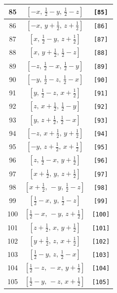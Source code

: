 \documentclass[fleqn,8pt]{jsarticle}
\begin{document}
\begin{longtable}{ccc}
85 & $\left[ - x,\, \frac{1}{2} - y,\, \frac{1}{2} - z \right]$ & {\tt [85]} \\ \hline
86 & $\left[ - x,\, y + \frac{1}{2},\, z + \frac{1}{2} \right]$ & {\tt [86]} \\ \hline
87 & $\left[ x,\, \frac{1}{2} - y,\, z + \frac{1}{2} \right]$ & {\tt [87]} \\ \hline
88 & $\left[ x,\, y + \frac{1}{2},\, \frac{1}{2} - z \right]$ & {\tt [88]} \\ \hline
89 & $\left[ - z,\, \frac{1}{2} - x,\, \frac{1}{2} - y \right]$ & {\tt [89]} \\ \hline
90 & $\left[ - y,\, \frac{1}{2} - z,\, \frac{1}{2} - x \right]$ & {\tt [90]} \\ \hline
91 & $\left[ y,\, \frac{1}{2} - z,\, x + \frac{1}{2} \right]$ & {\tt [91]} \\ \hline
92 & $\left[ z,\, x + \frac{1}{2},\, \frac{1}{2} - y \right]$ & {\tt [92]} \\ \hline
93 & $\left[ y,\, z + \frac{1}{2},\, \frac{1}{2} - x \right]$ & {\tt [93]} \\ \hline
94 & $\left[ - z,\, x + \frac{1}{2},\, y + \frac{1}{2} \right]$ & {\tt [94]} \\ \hline
95 & $\left[ - y,\, z + \frac{1}{2},\, x + \frac{1}{2} \right]$ & {\tt [95]} \\ \hline
96 & $\left[ z,\, \frac{1}{2} - x,\, y + \frac{1}{2} \right]$ & {\tt [96]} \\ \hline
97 & $\left[ x + \frac{1}{2},\, y,\, z + \frac{1}{2} \right]$ & {\tt [97]} \\ \hline
98 & $\left[ x + \frac{1}{2},\, - y,\, \frac{1}{2} - z \right]$ & {\tt [98]} \\ \hline
99 & $\left[ \frac{1}{2} - x,\, y,\, \frac{1}{2} - z \right]$ & {\tt [99]} \\ \hline
100 & $\left[ \frac{1}{2} - x,\, - y,\, z + \frac{1}{2} \right]$ & {\tt [100]} \\ \hline
101 & $\left[ z + \frac{1}{2},\, x,\, y + \frac{1}{2} \right]$ & {\tt [101]} \\ \hline
102 & $\left[ y + \frac{1}{2},\, z,\, x + \frac{1}{2} \right]$ & {\tt [102]} \\ \hline
103 & $\left[ \frac{1}{2} - y,\, z,\, \frac{1}{2} - x \right]$ & {\tt [103]} \\ \hline
104 & $\left[ \frac{1}{2} - z,\, - x,\, y + \frac{1}{2} \right]$ & {\tt [104]} \\ \hline
105 & $\left[ \frac{1}{2} - y,\, - z,\, x + \frac{1}{2} \right]$ & {\tt [105]} \\ \hline

\end{longtable}
\end{document}
